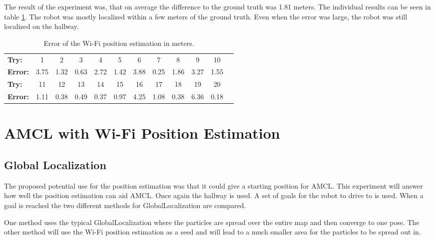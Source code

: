 The result of the experiment was, that on average the difference to the ground truth was 1.81 meters. The individual results can be seen in table \ref{table:exp1}. The robot was mostly localized within a few meters of the ground truth. Even when the error was large, the robot was still localized on the hallway.

\begin{table}[b]
\centering
\caption{Error of the Wi-Fi position estimation in meters.}
\label{table:exp1}
\begin{tabular}{l*{10}{c}r}
  \hline			
  \bf Try: & 1 & 2 & 3 & 4 & 5 & 6 & 7 & 8 & 9 & 10 \\
  \bf Error: & 3.75 & 1.32 & 0.63 & 2.72 & 1.42 & 3.88 & 0.25 & 1.86 & 3.27 & 1.55 \\
  \hline  
    \bf Try: & 11 & 12 & 13 & 14 & 15 & 16 & 17 & 18 & 19 & 20 \\
    \bf Error: & 1.11 & 0.38 & 0.49 & 0.37 & 0.97 & 4.25 & 1.08 & 0.38 & 6.36 & 0.18 \\
    \hline  
\end{tabular}
\end{table}

\section{AMCL with Wi-Fi Position Estimation}\label{sec:wifiposamcl}
\subsection{Global Localization}
The proposed potential use for the position estimation was that it could give a starting position for AMCL. This experiment will answer how well the position estimation can aid AMCL. Once again the hallway is used. A set of goals for the robot to drive to is used. When a goal is reached the two different methods for \gls{GlobalLocalization} are compared. 

One method uses the typical \gls{GlobalLocalization} where the particles are spread over the entire map and then converge to one pose. The other method will use the Wi-Fi position estimation as a seed and will lead to a much smaller area for the particles to be spread out in. 

